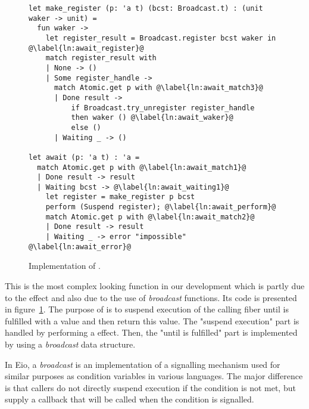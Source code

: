 \begin{figure}[ht]
    \begin{verbatim}
let make_register (p: 'a t) (bcst: Broadcast.t) : (unit waker -> unit) = 
  fun waker ->
    let register_result = Broadcast.register bcst waker in @\label{ln:await_register}@
    match register_result with
    | None -> ()
    | Some register_handle ->
      match Atomic.get p with @\label{ln:await_match3}@
      | Done result ->  
          if Broadcast.try_unregister register_handle
          then waker () @\label{ln:await_waker}@
          else ()
      | Waiting _ -> ()

let await (p: 'a t) : 'a = 
  match Atomic.get p with @\label{ln:await_match1}@
  | Done result -> result
  | Waiting bcst -> @\label{ln:await_waiting1}@
    let register = make_register p bcst
    perform (Suspend register); @\label{ln:await_perform}@
    match Atomic.get p with @\label{ln:await_match2}@
    | Done result -> result 
    | Waiting _ -> error "impossible" @\label{ln:await_error}@
  \end{verbatim}
    \caption{Implementation of .}
    \label{fig:sched-impl-await}
\end{figure}

This is the most complex looking function in our development which is partly due to the \esuspend{} effect and also due to the use of \emph{broadcast} functions.
Its code is presented in figure~\ref{fig:sched-impl-await}.
The purpose of  is to suspend execution of the calling fiber until  is fulfilled with a value and then return this value.
The "suspend execution" part is handled by performing a \esuspend{} effect.
Then, the "until  is fulfilled" part is implemented by using a \emph{broadcast} data structure.

In Eio, a \emph{broadcast} is an implementation of a signalling mechanism used for similar purposes as condition variables in various languages.
The major difference is that callers do not directly suspend execution if the condition is not met, but supply a callback that will be called when the condition is signalled.


